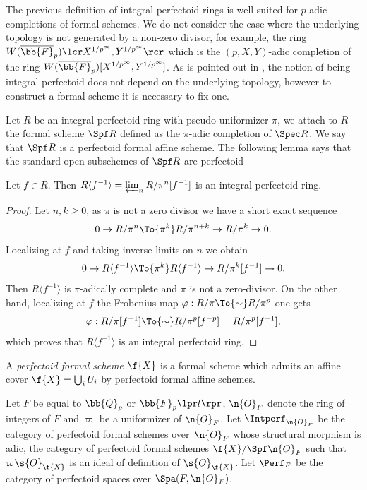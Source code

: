 \begin{remark}
The previous definition of integral perfectoid rings is well suited for $p$-adic completions of formal schemes. We do not consider the case where the underlying topology is not generated by a non-zero divisor, for example, the ring $W(\overline{\bb{F}}_p)\lcr X^{1/p^\infty}, Y^{1/p^{\infty}}\rcr$ which is the $(p,X,Y)$-adic completion of the ring $W(\overline{\bb{F}}_p)[X^{1/p^{\infty}}, Y^{1/p^{\infty}}]$. As is pointed out in \cite[Rem.\,3.8]{MR3905467}, the notion of being integral perfectoid does not depend on the underlying topology, however to construct a formal scheme it is necessary to fix one.
\end{remark}

Let $R$ be an integral perfectoid ring with pseudo-uniformizer $\pi$, we attach to $R$ the formal scheme $\Spf R$ defined as the $\pi$-adic completion of $\Spec R$. We say that $\Spf R$ is a perfectoid formal affine scheme. The following lemma says that the standard open subschemes of $\Spf R$ are perfectoid

\begin{lem}
\label{lemLocalizationperf}
Let $f\in R$. Then $R\langle f^{-1} \rangle= \varprojlim_n R/\pi^n [f^{-1}]$ is an integral perfectoid ring.
\end{lem}

\begin{proof}
Let $n,k\geq 0$, as $\pi$ is not a zero divisor we have a short exact sequence
\[
0\to R/\pi^n \To{\pi^k} R/\pi^{n+k}\to R/\pi^k \to 0.
\]
Localizing at $f$ and taking inverse limits on $n$ we obtain
\[
0\to R\langle f^{-1}\rangle\To{\pi^k} R\langle f^{-1} \rangle\to R/\pi^{k} [f^{-1}]\to 0.
\]
Then $R\langle f^{-1} \rangle$ is $\pi$-adically complete and $\pi$ is not a zero-divisor. On the other hand, localizing at $f$ the Frobenius map
$\varphi: R/\pi \To{\sim} R/\pi^p$ one gets
\[
\varphi: R/\pi[f^{-1}]\To{\sim} R/\pi^{p}[f^{-p}]= R/\pi^p [f^{-1}],
\]
which proves that $R\langle f^{-1}\rangle$ is an integral perfectoid ring.
\end{proof}

\begin{definition}
A \textit{perfectoid formal scheme} $\f{X}$ is a formal scheme which admits an affine cover $\f{X}=\bigcup_i U_i$ by perfectoid formal affine schemes.
\end{definition}

Let $F$ be equal to $\bb{Q}_p$ or $\bb{F}_p\lpr t\rpr$, $\n{O}_F$ denote the ring of integers of $F$ and $\varpi$ be a uniformizer of $\n{O}_F$. Let $\Intperf_{\n{O}_F}$ be the category of perfectoid formal schemes over~$\n{O}_F$ whose structural morphism is adic, \ie the category of perfectoid formal schemes $\f{X}/\Spf \n{O}_F$ such that $\varpi \s{O}_{\f{X}}$ is an ideal of definition of $\s{O}_{\f{X}}$. Let $\Perf_F$ be the category of perfectoid spaces over $\Spa(F,\n{O}_F)$.

